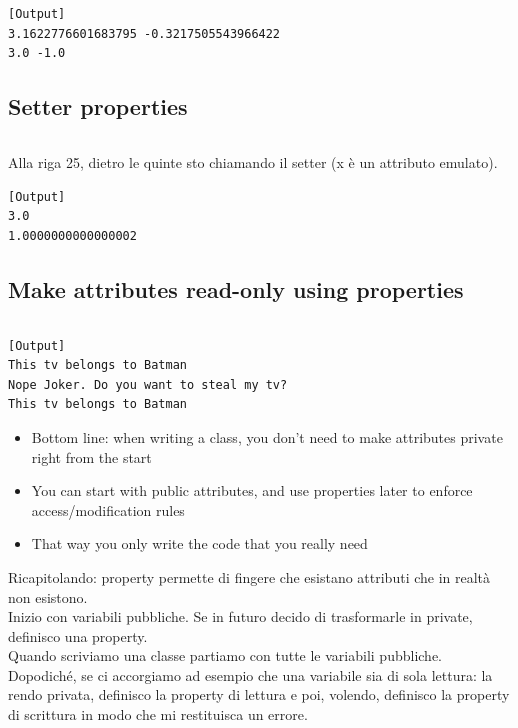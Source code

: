 \inputminted{python}{snippets/vector2d_property.py}

\begin{verbatim}
[Output]
3.1622776601683795 -0.3217505543966422
3.0 -1.0
\end{verbatim}

\subsection{Setter properties}

\inputminted{python}{snippets/vector2d_property_setter.py}
Alla riga 25, dietro le quinte sto chiamando il setter (x è un attributo emulato).
\begin{verbatim}
[Output]
3.0
1.0000000000000002
\end{verbatim}

\subsection{Make attributes read-only using properties}


\inputminted{python}{snippets/class_tv_encapsulation_properties.py}

\begin{verbatim}
[Output]
This tv belongs to Batman
Nope Joker. Do you want to steal my tv?
This tv belongs to Batman
\end{verbatim}

\hfill
\vfill

\begin{tcolorbox}[width=\textwidth,colback={white},title={Final note on properties },colbacktitle=cyan,coltitle=black]
  \begin{itemize}
    \item Bottom line: when writing a class, you don't need to make attributes
          private right from the start
    \item You can start with public attributes, and use properties later to
          enforce access/modification rules
    \item That way you only write the code that you really need
  \end{itemize}

Ricapitolando: property permette di fingere che esistano attributi che in realtà non esistono.\\
Inizio con variabili pubbliche. Se in futuro decido di trasformarle in private, definisco una property.\\

Quando scriviamo una classe partiamo con tutte le variabili pubbliche. Dopodiché, se ci accorgiamo ad esempio che una variabile sia di sola lettura: la rendo privata, definisco la property di lettura e poi, volendo, definisco la property di scrittura in modo che mi restituisca un errore.\\
\end{tcolorbox}


